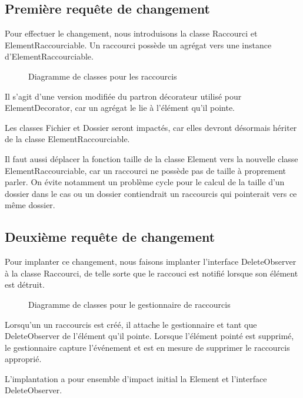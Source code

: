 \documentclass{article}
\begin{document}
  \subsection{Première requête de changement}

  Pour effectuer le changement, nous introduisons la classe \textsf{Raccourci}
  et \textsf{ElementRaccourciable}. Un raccourci possède un agrégat vers une
  instance d'\textsf{ElementRaccourciable}.

  \begin{figure}
    \centering
    \resizebox{\textwidth}{!}{}
    \caption{Diagramme de classes pour les raccourcis}
  \end{figure}

  Il s'agit d'une version modifiée du partron décorateur utilisé pour
  \textsf{ElementDecorator}, car un agrégat le lie à l'élément qu'il pointe.

  Les classes \textsf{Fichier} et \textsf{Dossier} seront impactés, car elles
  devront désormais hériter de la classe \textsf{ElementRaccourciable}.

  Il faut aussi déplacer la fonction \textsf{taille} de la classe
  \textsf{Element} vers la nouvelle classe \textsf{ElementRaccourciable}, car un
  raccourci ne possède pas de taille à proprement parler. On évite notamment un
  problème cycle pour le calcul de la taille d'un dossier dans le cas ou un
  dossier contiendrait un raccourcis qui pointerait vers ce même dossier.

  \subsection{Deuxième requête de changement}
  Pour implanter ce changement, nous faisons implanter l'interface
  \textsf{DeleteObserver} à la classe \textsf{Raccourci}, de telle sorte que le
  raccouci est notifié lorsque son élément est détruit.

  \begin{figure}
    \centering
    \resizebox{\textwidth}{!}{}
    \caption{Diagramme de classes pour le gestionnaire de raccourcis}
  \end{figure}

  Lorsqu'un un raccourcis est créé, il attache le gestionnaire et tant que
  DeleteObserver de l'élément qu'il pointe. Lorsque l'élément pointé est
  supprimé, le gestionnaire capture l'événement et est en mesure de supprimer le
  raccourcis approprié.

  L'implantation a pour ensemble d'impact initial la \textsf{Element} et
  l'interface \textsf{DeleteObserver}.
\end{document}
